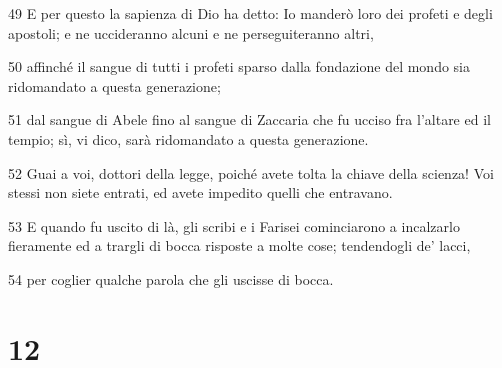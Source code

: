 \par 49 E per questo la sapienza di Dio ha detto: Io manderò loro dei profeti e degli apostoli; e ne uccideranno alcuni e ne perseguiteranno altri,
\par 50 affinché il sangue di tutti i profeti sparso dalla fondazione del mondo sia ridomandato a questa generazione;
\par 51 dal sangue di Abele fino al sangue di Zaccaria che fu ucciso fra l'altare ed il tempio; sì, vi dico, sarà ridomandato a questa generazione.
\par 52 Guai a voi, dottori della legge, poiché avete tolta la chiave della scienza! Voi stessi non siete entrati, ed avete impedito quelli che entravano.
\par 53 E quando fu uscito di là, gli scribi e i Farisei cominciarono a incalzarlo fieramente ed a trargli di bocca risposte a molte cose; tendendogli de' lacci,
\par 54 per coglier qualche parola che gli uscisse di bocca.

\chapter{12}

